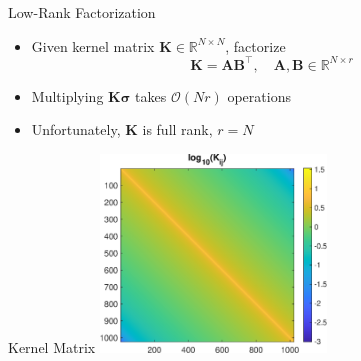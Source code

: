 \documentclass[aspectratio=169]{beamer}
\renewcommand{\Vec}[1]{\bm{#1}}
\newcommand{\Mat}[1]{\mathbf{#1}}
\newcommand{\Ord}{\mathcal{O}}
\newcommand{\RR}{\mathbb{R}}
\begin{document}
\begin{frame}{Low-Rank Factorization}
  \begin{itemize}
    \item
      Given kernel matrix $\Mat{K} \in \RR^{N \times N}$, factorize
      \begin{equation*}
        \Mat{K} = \Mat{A} \Mat{B}^\top, \quad \Mat{A}, \Mat{B} \in \RR^{N \times
        r}
      \end{equation*}
    \item
      Multiplying $\Mat{K} \Vec{\sigma}$ takes $\Ord(N r)$ operations
    \item
      Unfortunately, $\Mat{K}$ is full rank, $r = N$
  \end{itemize}
\end{frame}

\begin{frame}{Kernel Matrix}
  \centering
  \includegraphics[width=0.45\textwidth]{../figures/kernel_magnitude.eps}
\end{frame}
\end{document}
